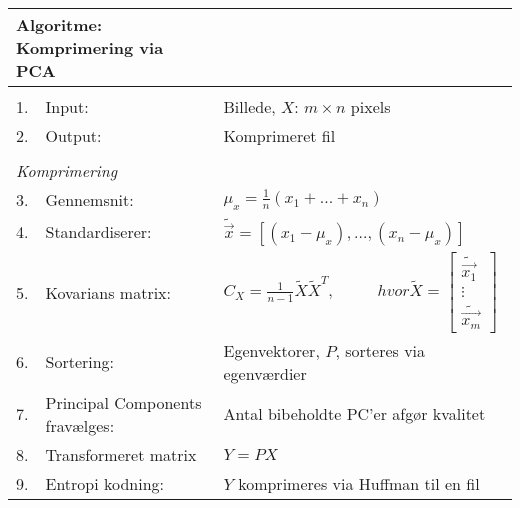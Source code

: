 \begin{table}[!h]
\centering
\begin{tabular}{lll}
\hline
\multicolumn{2}{l}{\textbf{Algoritme: Komprimering via PCA}}    &                                                                   \\ \hline
\\
\multicolumn{1}{|l}{1.}        & Input:                     & Billede, $X$: $m \times n$ pixels                                   \\
\multicolumn{1}{|l}{2.}        & Output:                    & Komprimeret fil                                           \\
                               &                            &                                                                   \\
\multicolumn{2}{|l}{\textit{Komprimering}}                 &                                                                   \\
\multicolumn{1}{|l}{3.}        & Gennemsnit:                  & $\mu_{x} = \frac{1}{n}(x_1+ ... + x_n)$           \\
\multicolumn{1}{|l}{4.}        & Standardiserer:			 & 
$\tilde{\vec{x}} = [(x_1 - \mu_{x}),…,(x_n - \mu_{x})]$          \\
\multicolumn{1}{|l}{5.}        & Kovarians matrix:              & 
$C_X=\frac{1}{n-1} \tilde{X}\tilde{X}^T , \phantom{mmm} hvor \tilde{X}= \begin{bmatrix} \tilde{\vec{x_1}} \\		\vdots	\\ \tilde{\vec{x_m}}  \end{bmatrix}$           \\
\multicolumn{1}{|l}{6.}        & Sortering:              & Egenvektorer, $P$, sorteres via egenværdier \\
\multicolumn{1}{|l}{7.}        & Principal Components fravælges:    			& 
Antal bibeholdte PC'er afgør kvalitet  \\
\multicolumn{1}{|l}{8.}        & Transformeret matrix          & 
$Y = PX$            \\
\multicolumn{1}{|l}{9.}        & Entropi kodning:                & $Y$ komprimeres via Huffman til en fil            \\
\end{tabular}
\label{tb:Algoritme-Komprimering-PCA}
\end{table}





